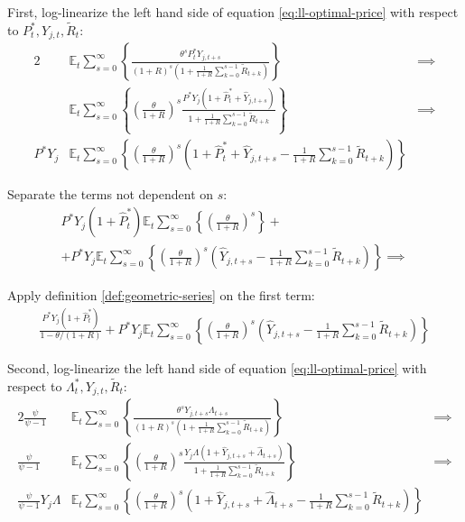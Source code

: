 \documentclass[
	12pt, 
	]{article}
\numberwithin{equation}{section}
\newcommand{\E}[1][t]{{\mathbb{E}_{#1}}}
\theoremstyle{definition}
\theoremstyle{plain}
\theoremstyle{plain}
\theoremstyle{plain}
\begin{document}
First, log-linearize the left hand side of equation \ref{eq:ll-optimal-price} with respect to \( P_t^\ast, Y_{j,t}, \widetilde{R}_t \):
\begin{alignat}{2}
	& \E \sum_{s=0}^{\infty} \left\{ \frac{\theta^s P_t^\ast Y_{j,t+s}}{ (1 + R)^s \left( 1 + \frac{1}{1 + R} \sum_{k=0}^{s-1} \widetilde{R}_{t+k} \right) } \right\} &\implies \nonumber \\
	& \E \sum_{s=0}^{\infty} \left\{ \left( \frac{\theta}{1 + R} \right)^s  \frac{ P^\ast Y_{j} \left( 1 + \hat{P}_t^\ast + \hat{Y}_{j,t+s} \right) }{ 1 + \frac{1}{1 + R} \sum_{k=0}^{s-1} \widetilde{R}_{t+k} } \right\} &\implies \nonumber \\
	P^\ast Y_{j} &\E \sum_{s=0}^{\infty} \left\{ \left( \frac{\theta}{1 + R} \right)^s \left( 1 + \hat{P}_t^\ast + \hat{Y}_{j,t+s} - \frac{1}{1 + R} \sum_{k=0}^{s-1} \widetilde{R}_{t+k} \right) \right\} & \nonumber
\end{alignat}

Separate the terms not dependent on $s$:
\begin{multline}
	P^\ast Y_{j} ( 1 + \hat{P}_t^\ast ) \E \sum_{s=0}^{\infty} \left\{ \left( \frac{\theta}{1 + R} \right)^s \right\} + \\
	+ P^\ast Y_{j} \E \sum_{s=0}^{\infty} \left\{ \left( \frac{\theta}{1 + R} \right)^s \left( \hat{Y}_{j,t+s} - \frac{1}{1 + R} \sum_{k=0}^{s-1} \widetilde{R}_{t+k} \right) \right\} \implies \nonumber
\end{multline}

Apply definition \ref{def:geometric-series} on the first term:
\begin{align}
	\frac{ P^\ast Y_{j} ( 1 + \hat{P}_t^\ast ) }{1-\theta /(1+R)} + P^\ast Y_{j} \E \sum_{s=0}^{\infty} \left\{ \left( \frac{\theta}{1 + R} \right)^s \left( \hat{Y}_{j,t+s} - \frac{1}{1 + R} \sum_{k=0}^{s-1} \widetilde{R}_{t+k} \right) \right\} \nonumber
\end{align}

Second, log-linearize the left hand side of equation \ref{eq:ll-optimal-price} with respect to \( \Lambda_t^\ast, Y_{j,t}, \widetilde{R}_t \):
\begin{alignat}{2}
	\frac{\psi}{\psi-1} &\E \sum_{s=0}^{\infty} \left\{ \frac{\theta^s Y_{j,t+s} \Lambda_{t+s}}{ (1 + R)^s \left( 1 + \frac{1}{1 + R} \sum_{k=0}^{s-1} \widetilde{R}_{t+k} \right) } \right\} & \implies \nonumber \\
	\frac{\psi}{\psi-1} &\E \sum_{s=0}^{\infty} \left\{ \left( \frac{\theta}{1 + R} \right)^s \frac{ Y_{j} \Lambda (1+ \hat{Y}_{j,t+s} + \hat{\Lambda}_{t+s}) }{ 1 + \frac{1}{1 + R} \sum_{k=0}^{s-1} \widetilde{R}_{t+k} } \right\} & \implies \nonumber \\
	\frac{\psi}{\psi-1} Y_{j} \Lambda &\E \sum_{s=0}^{\infty} \left\{ \left( \frac{\theta}{1 + R} \right)^s \left( 1+ \hat{Y}_{j,t+s} + \hat{\Lambda}_{t+s} - \frac{1}{1 + R} \sum_{k=0}^{s-1} \widetilde{R}_{t+k} \right) \right\} & \nonumber
\end{alignat}
\end{document}
